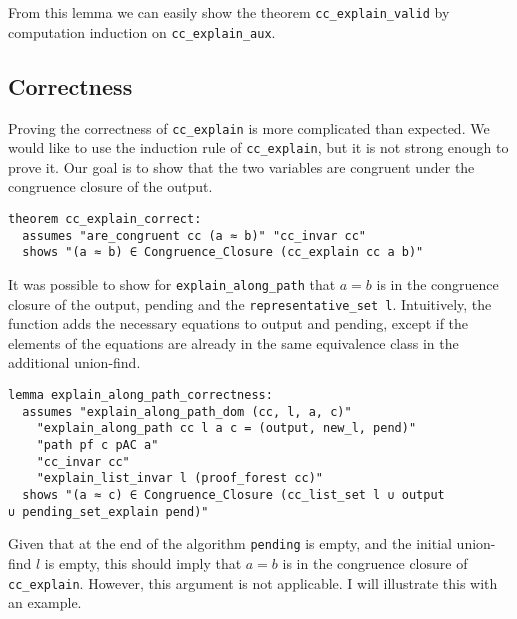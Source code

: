 From this lemma we can easily show the theorem \lstinline{cc_explain_valid} by computation induction on \lstinline{cc_explain_aux}.

\subsection{Correctness}

Proving the correctness of \lstinline{cc_explain} is more complicated than expected. We would like to use the induction rule of \lstinline{cc_explain}, but it is not strong enough to prove it. Our goal is to show that the two variables are congruent under the congruence closure of the output.

\begin{lstlisting}
theorem cc_explain_correct:
  assumes "are_congruent cc (a ≈ b)" "cc_invar cc"
  shows "(a ≈ b) ∈ Congruence_Closure (cc_explain cc a b)"
\end{lstlisting}

It was possible to show for \lstinline{explain_along_path} that $a = b$ is in the congruence closure of the output, pending and the \lstinline{representative_set l}. Intuitively, the function adds the necessary equations to output and pending, except if the elements of the equations are already in the same equivalence class in the additional union-find.

\begin{lstlisting}
lemma explain_along_path_correctness:
  assumes "explain_along_path_dom (cc, l, a, c)"
    "explain_along_path cc l a c = (output, new_l, pend)"
    "path pf c pAC a"
    "cc_invar cc"
    "explain_list_invar l (proof_forest cc)"
  shows "(a ≈ c) ∈ Congruence_Closure (cc_list_set l ∪ output
∪ pending_set_explain pend)"
\end{lstlisting}

Given that at the end of the algorithm \lstinline{pending} is empty, and the initial union-find $l$ is empty, this should imply that $a = b$ is in the congruence closure of \lstinline{cc_explain}.
However, this argument is not applicable. I will illustrate this with an example.

